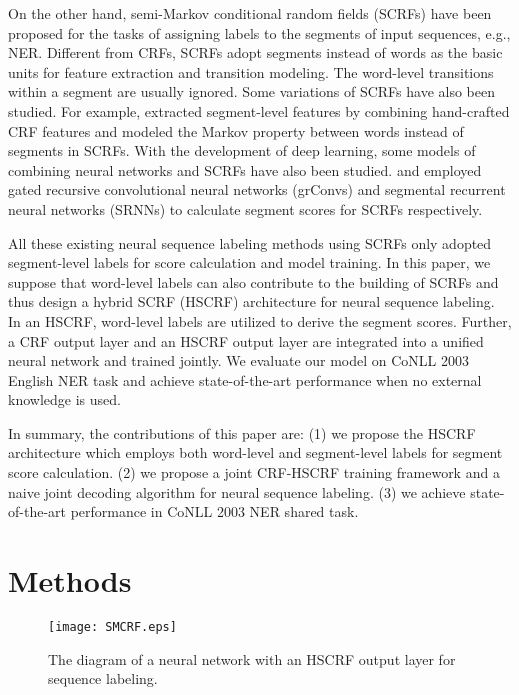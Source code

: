 \documentclass[11pt,a4paper]{article}
\begin{document}
On the other hand, semi-Markov conditional random fields (SCRFs) \cite{sarawagi2005semi} have been proposed for the tasks of assigning labels to the segments of input sequences,
e.g., NER.
Different from CRFs, SCRFs adopt segments instead of words as the basic units for feature extraction and transition modeling.
The word-level transitions within a segment are usually ignored.
Some variations of SCRFs have also been studied. For example,
\citet{andrew2006hybrid} extracted segment-level features by combining hand-crafted CRF features and modeled the Markov property between words instead of segments in SCRFs.
With the development of deep learning, some models of combining neural networks and SCRFs have also been studied.
\citet{zhuo2016segment} and \citet{kong2015segmental}  employed gated recursive convolutional neural networks (grConvs) and segmental recurrent neural networks (SRNNs) to  calculate segment scores for SCRFs respectively.

All these existing neural sequence labeling methods using SCRFs only adopted segment-level labels for score calculation and model training.
In this paper, we suppose that word-level labels can also contribute to the building of SCRFs and
thus design a hybrid SCRF (HSCRF) architecture for neural sequence labeling.
In an HSCRF, word-level labels  are utilized to derive the segment scores.
Further, a CRF output layer and an HSCRF output layer are integrated into a unified neural network and trained jointly.
We evaluate our model on CoNLL 2003 English NER task \cite{tjong2003introduction} and achieve state-of-the-art performance when no external knowledge is used.


In summary, the  contributions of this paper are:
(1) we propose the HSCRF architecture which employs both word-level and segment-level labels for segment score calculation.
(2) we propose a joint CRF-HSCRF training framework and a naive joint decoding algorithm for neural sequence labeling.
(3) we achieve state-of-the-art performance in CoNLL 2003 NER shared task.


\section{Methods}



\begin{figure}[!t]
\centering
\texttt{[image: SMCRF.eps]}
\caption{The diagram of a neural network with an HSCRF output layer for sequence labeling.}
\label{fig:SCRF}
\end{figure}
\end{document}
